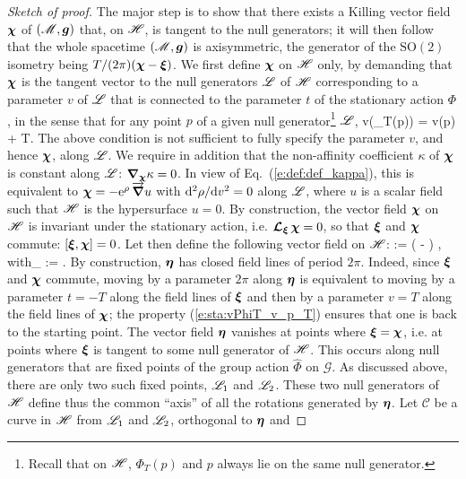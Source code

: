 \begin{proof}[Sketch of proof]
The major step is to show that there exists a Killing vector
field $\bm{\chi}$ of $(\mathscr{M},\bm{g})$ that, on $\mathscr{H}$, is tangent to the null generators;
it will then follow that the whole spacetime $(\mathscr{M},\bm{g})$ is axisymmetric,
the generator of the $\mathrm{SO}(2)$ isometry being $T/(2\pi)(\bm{\chi} - \bm{\xi})$.
We first define $\bm{\chi}$ on $\mathscr{H}$ only, by demanding that $\bm{\chi}$ is the tangent vector to the null generators $\mathscr{L}$ of $\mathscr{H}$
corresponding to a parameter $v$ of $\mathscr{L}$ that is connected to the parameter
$t$ of the stationary action $\Phi$, in the sense that for any point $p$
of a given null generator\footnote{Recall that on $\mathscr{H}$, $\Phi_T(p)$ and $p$ always lie on the same null generator.} $\mathscr{L}$,
\be
\label{e:sta:vPhiT_v_p_T}
    v(\Phi_T(p)) = v(p) + T.
\ee
The above condition is not sufficient to fully specify the parameter $v$, and hence $\bm{\chi}$,
along $\mathscr{L}$. We require in addition that
the non-affinity coefficient $\kappa$ of
$\bm{\chi}$ is constant along $\mathscr{L}$: $\bm{\nabla}_{\bm{\chi}} \kappa = 0$.
In view of Eq.~(\ref{e:def:def_kappa}),
this is equivalent to $\bm{\chi} = - \mathrm{e}^{\rho} \, \overrightarrow{\bm{\nabla}} u$
with $\mathrm{d}^2\rho/\mathrm{d} v^2 = 0$ along $\mathscr{L}$,  where $u$ is a scalar field
such that $\mathscr{H}$ is the hypersurface $u=0$.
By construction, the vector field $\bm{\chi}$ on $\mathscr{H}$ is invariant
under the stationary action, i.e. $\bm{\mathcal{L}}_{\bm{\xi}}\, \bm{\chi} = 0$, so that
$\bm{\xi}$ and $\bm{\chi}$ commute: $[\bm{\xi}, \bm{\chi}] = 0$.
Let then define the following vector field on $\mathscr{H}$:
\be \label{e:sta:def_eta_rigidity}
    \w{\eta} :=  \left( \w{\chi} - \w{\xi} \right) ,
    \qquad \mbox{with}\quad \Omega_{\Hor} :=  .
\ee
By construction, $\bm{\eta}$ has closed field lines of period $2\pi$.
Indeed, since $\bm{\xi}$ and $\bm{\chi}$ commute, moving by a parameter $2\pi$
along $\bm{\eta}$ is equivalent to moving by a parameter $t=-T$ along the field
lines of $\bm{\xi}$ and then by a parameter $v=T$ along the field lines of
$\bm{\chi}$; the property (\ref{e:sta:vPhiT_v_p_T}) ensures that one is back
to the starting point.
The vector field $\bm{\eta}$ vanishes at points where $\bm{\xi} = \bm{\chi}$,
i.e. at points where $\bm{\xi}$ is tangent to some null generator of $\mathscr{H}$.
This occurs along null generators that are fixed points of the group
action $\hat{\Phi}$ on $\mathscr{G}$.
As discussed above, there are only two such fixed points, $\mathscr{L}_1$ and $\mathscr{L}_2$.
These two null generators
of $\mathscr{H}$ define thus the common ``axis'' of all the rotations generated
by $\bm{\eta}$.
Let $\mathscr{C}$ be a curve in $\mathscr{H}$
from $\mathscr{L}_1$ and $\mathscr{L}_2$, orthogonal to $\bm{\eta}$ and

\end{proof}
